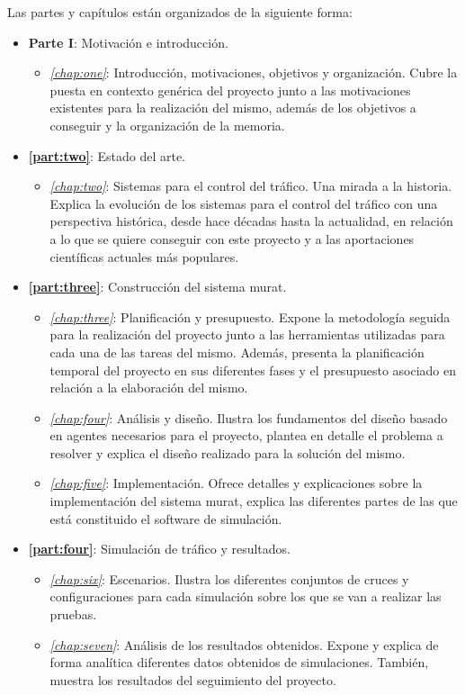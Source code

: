 Las partes y capítulos están organizados de la siguiente forma:
\begin{itemize}
    \item \textbf{Parte I}: Motivación e introducción. 
    \begin{itemize}
        \item \textit{\autoref{chap:one}}: Introducción, motivaciones, objetivos y organización. Cubre la puesta en contexto genérica del proyecto junto a las motivaciones existentes para la realización del mismo, además de los objetivos a conseguir y la organización de la memoria. 
    \end{itemize}

    \item \textbf{\autoref{part:two}}: Estado del arte.
    \begin{itemize}
        \item \textit{\autoref{chap:two}}: Sistemas para el control del tráfico. Una mirada a la historia. Explica la evolución de los sistemas para el control del tráfico con una perspectiva histórica, desde hace décadas hasta la actualidad, en relación a lo que se quiere conseguir con este proyecto y a las aportaciones científicas actuales más populares.
    \end{itemize}

    \item \textbf{\autoref{part:three}}: Construcción del sistema \acrshort{murat}.
    \begin{itemize}
        \item \textit{\autoref{chap:three}}: Planificación y presupuesto. Expone la metodología seguida para la realización del proyecto junto a las herramientas utilizadas para cada una de las tareas del mismo. Además, presenta la planificación temporal del proyecto en sus diferentes fases y el presupuesto asociado en relación a la elaboración del mismo.
        \item \textit{\autoref{chap:four}}: Análisis y diseño. Ilustra los fundamentos del diseño basado en agentes necesarios para el proyecto, plantea en detalle el problema a resolver y explica el diseño realizado para la solución del mismo.  
        \item \textit{\autoref{chap:five}}: Implementación. Ofrece detalles y explicaciones sobre la implementación del sistema \acrshort{murat}, explica las diferentes partes de las que está constituido el software de simulación.
    \end{itemize}

    \item \textbf{\autoref{part:four}}: Simulación de tráfico y resultados.
    \begin{itemize}
        \item \textit{\autoref{chap:six}}: Escenarios. Ilustra los diferentes conjuntos de cruces y configuraciones para cada simulación sobre los que se van a realizar las pruebas.
        \item \textit{\autoref{chap:seven}}: Análisis de los resultados obtenidos. Expone y explica de forma analítica diferentes datos obtenidos de simulaciones. También, muestra los resultados del seguimiento del proyecto.  
    \end{itemize}
    

\end{itemize}
